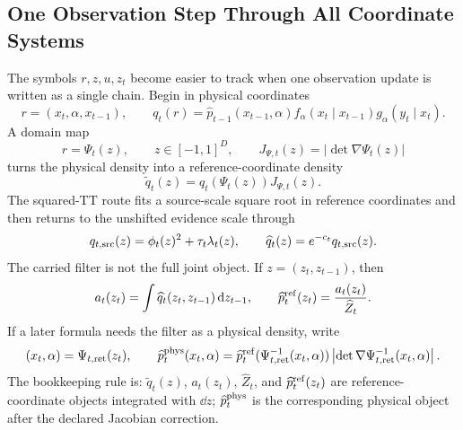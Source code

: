 \subsection{One Observation Step Through All Coordinate Systems}
\label{sec:bf-hd-ttkr-coordinate-walkthrough}

The symbols \(r,z,u,z_t\) become easier to track when one observation update is
written as a single chain.  Begin in physical coordinates
\begin{equation}
  r=(x_t,\alpha,x_{t-1}),
  \qquad
  q_t(r)=
  \widehat p_{t-1}(x_{t-1},\alpha)
  f_\alpha(x_t\mid x_{t-1})
  g_\alpha(y_t\mid x_t).
  \label{eq:bf-hd-ttkr-walk-physical}
\end{equation}
A domain map
\begin{equation}
  r=\Psi_t(z),
  \qquad
  z\in[-1,1]^D,
  \qquad
  J_{\Psi,t}(z)=|\det\nabla\Psi_t(z)|
  \label{eq:bf-hd-ttkr-walk-domain}
\end{equation}
turns the physical density into a reference-coordinate density
\begin{equation}
  \widetilde q_t(z)=q_t(\Psi_t(z))J_{\Psi,t}(z).
  \label{eq:bf-hd-ttkr-walk-reference}
\end{equation}
The squared-TT route fits a source-scale square root in reference coordinates and
then returns to the unshifted evidence scale through
\begin{equation}
  q_{t,{\rm src}}(z)=\phi_t(z)^2+\tau_t\lambda_t(z),
  \qquad
  \widehat q_t(z)=e^{-c_t}q_{t,{\rm src}}(z).
  \label{eq:bf-hd-ttkr-walk-source-evidence}
\end{equation}
The carried filter is not the full joint object.  If \(z=(z_t,z_{t-1})\), then
\begin{equation}
  a_t(z_t)=\int \widehat q_t(z_t,z_{t-1})\,\mathrm d z_{t-1},
  \qquad
  \widehat p_t^{\rm ref}(z_t)=\frac{a_t(z_t)}{\widehat Z_t}.
  \label{eq:bf-hd-ttkr-walk-retained}
\end{equation}
If a later formula needs the filter as a physical density, write
\begin{equation}
  (x_t,\alpha)=\Psi_{t,{\rm ret}}(z_t),
  \qquad
  \widehat p_t^{\rm phys}(x_t,\alpha)=
  \widehat p_t^{\rm ref}(\Psi_{t,{\rm ret}}^{-1}(x_t,\alpha))
  \left|\det\nabla\Psi_{t,{\rm ret}}^{-1}(x_t,\alpha)\right|.
  \label{eq:bf-hd-ttkr-walk-physical-filter}
\end{equation}
The bookkeeping rule is: \(\widetilde q_t(z)\), \(a_t(z_t)\), \(\widehat Z_t\),
and \(\widehat p_t^{\rm ref}(z_t)\) are reference-coordinate objects integrated
with \(\dd z\); \(\widehat p_t^{\rm phys}\) is the corresponding physical
object after the declared Jacobian correction.

